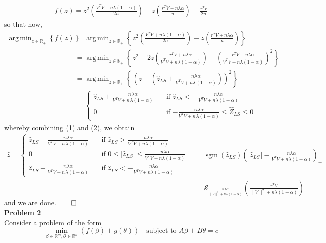 \documentclass[10pt]{article}
\newcommand{\bp}[1]{\left({#1}\right)}
\newcommand{\mbb}[1]{\mathbb{#1}}
\newcommand{\1}[1]{\mathbbm{1}_{#1}}
\newcommand{\mc}[1]{\mathcal{#1}}
\DeclareMathOperator{\argmin}{arg\,min}
\DeclareMathOperator{\sgm}{sgm}
\begin{document}
    \begin{align*}
        f(z)=z^2\bp{\frac{V^TV+n\lambda(1-\alpha)}{2n}}-z\bp{\frac{r^TV+n\lambda\alpha}{n}}+\frac{r^Tr}{2n}
    \end{align*}
    so that now,
    \begin{align*}
        \argmin_{z\in\mbb{R}_+}\left\{f(z)\right\}&=\argmin_{z\in\mbb{R}_+}\left\{z^2\bp{\frac{V^TV+n\lambda(1-\alpha)}{2n}}-z\bp{\frac{r^TV+n\lambda\alpha}{n}}\right\}\\
        &=\argmin_{z\in\mbb{R}_+}\left\{z^2-2z\bp{\frac{r^TV+n\lambda\alpha}{V^TV+n\lambda(1-\alpha)}}+\bp{\frac{r^TV+n\lambda\alpha}{V^TV+n\lambda(1-\alpha)}}^2\right\}\\
        &=\argmin_{z\in\mbb{R}_+}\left\{\bp{z-\bp{\hat{z}_{LS}+\frac{n\lambda\alpha}{V^TV+n\lambda(1-\alpha)}}}^2\right\}\\
        &=\begin{cases}
            \hat{z}_{LS}+\frac{n\lambda\alpha}{V^TV+n\lambda(1-\alpha)}\quad&\text{if $\hat{z}_{LS}<-\tfrac{n\lambda\alpha}{V^TV+n\lambda(1-\alpha)}$}\\
            0\quad&\text{if $-\frac{n\lambda\alpha}{V^TV+n\lambda(1-\alpha)}\leq\hat{Z}_{LS}\leq 0$}
        \end{cases}\tag{2}
    \end{align*}
    whereby combining (1) and (2), we obtain
    \begin{align*}
        \hat{z}=\begin{cases}
            \hat{z}_{LS}-\frac{n\lambda\alpha}{V^TV+n\lambda(1-\alpha)}\quad & \text{if $\hat{z}_{LS}>\frac{n\lambda\alpha}{V^TV+n\lambda(1-\alpha)}$}\\
            0\quad & \text{if $0\leq |\hat{z}_{LS}|\leq\frac{n\lambda\alpha}{V^TV+n\lambda(1-\alpha)}$}\\
            \hat{z}_{LS}+\frac{n\lambda\alpha}{V^TV+n\lambda(1-\alpha)}\quad &\text{if $\hat{z}_{LS}<-\tfrac{n\lambda\alpha}{V^TV+n\lambda(1-\alpha)}$}
        \end{cases}&=\sgm(\hat{z}_{LS})\bp{|\hat{z}_{LS}|-\frac{n\lambda\alpha}{V^TV+n\lambda(1-\alpha)}}_+\\
        &=\mc{S}_{\frac{n\lambda\alpha}{\|V\|^2+n\lambda(1-\alpha)}}\bp{\frac{r^TV}{\|V\|^2+n\lambda(1-\alpha)}}
    \end{align*}
    and we are done.\hfill{$\qed$}\\[5pt]
    {\bf Problem 2}\\[5pt]
    Consider a problem of the form 
    \[\min_{\beta\in\mbb{R}^m,\theta\in\mbb{R}^n}(f(\beta)+g(\theta))\quad\text{subject to $A\beta+B\theta=c$}\]
\end{document}
